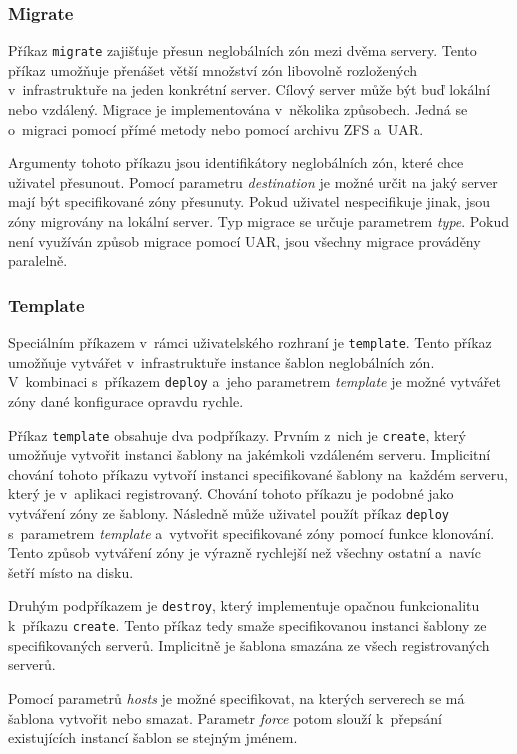 \subsubsection{Migrate}
\label{chapter:implementation:client:cli:migrate}
Příkaz \verb|migrate| zajišťuje přesun neglobálních zón mezi dvěma servery. Tento příkaz umožňuje přenášet větší množství zón
libovolně rozložených v~infrastruktuře na jeden konkrétní server. Cílový server může být buď lokální nebo vzdálený. Migrace
je implementována v~několika způsobech. Jedná se o~migraci pomocí přímé metody nebo pomocí archivu ZFS a~UAR.

Argumenty tohoto příkazu jsou identifikátory neglobálních zón, které chce uživatel přesunout. Pomocí parametru \textit{destination}
je možné určit na jaký server mají být specifikované zóny přesunuty. Pokud uživatel nespecifikuje jinak, jsou zóny migrovány
na lokální server. Typ migrace se určuje parametrem \textit{type}. Pokud není využíván způsob migrace pomocí UAR, jsou všechny
migrace prováděny paralelně.
\subsubsection{Template}
\label{chapter:implementation:client:cli:template}
Speciálním příkazem v~rámci uživatelského rozhraní je \verb|template|. Tento příkaz umožňuje vytvářet v~infrastruktuře instance
šablon neglobálních zón. V~kombinaci s~příkazem \verb|deploy| a~jeho parametrem \textit{template} je možné vytvářet zóny
dané konfigurace opravdu rychle.

Příkaz \verb|template| obsahuje dva podpříkazy. Prvním z~nich je \verb|create|, který umožňuje vytvořit instanci šablony na 
jakémkoli vzdáleném serveru. Implicitní chování tohoto příkazu vytvoří instanci specifikované šablony na~každém serveru, který
je v~aplikaci registrovaný.
Chování tohoto příkazu je podobné jako vytváření zóny ze šablony. Následně může uživatel použít příkaz \verb|deploy|
s~parametrem \textit{template} a~vytvořit specifikované zóny pomocí funkce klonování. Tento způsob vytváření zóny je výrazně
rychlejší než všechny ostatní a~navíc šetří místo na disku.

Druhým podpříkazem je \verb|destroy|, který implementuje opačnou funkcionalitu k~příkazu \verb|create|. Tento příkaz tedy 
smaže specifikovanou instanci šablony ze specifikovaných serverů. Implicitně je šablona smazána ze všech registrovaných serverů.

Pomocí parametrů \textit{hosts} je možné specifikovat, na kterých serverech se má šablona vytvořit nebo smazat. Parametr
\textit{force} potom slouží k~přepsání existujících instancí šablon se stejným jménem.
